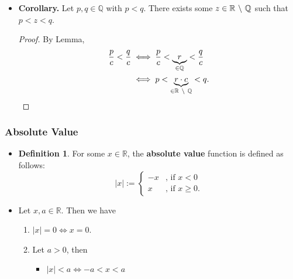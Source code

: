 \documentclass{article}
\newcommand{\Q}{\mathbb{Q}}
\newcommand{\R}{\mathbb{R}}
\newcommand{\?}{\stackrel{?}{=}}
\newcommand{\smallblacksquare}{\rule{0.5em}{0.5em}}
\theoremstyle{definition} %
\newtheorem{definition}[subsection]{Definition} %
\begin{document}
\begin{itemize}
\begin{proof}
\begin{align*}
            &\leq \frac{nx + 1}{n} \\
            &= x + \frac{1}{n} \\
            &= x + y - x \\
            &< y.
        \end{align*}
    \end{proof}
    \item \textbf{Corollary.} Let $p, q \in \Q$ with $p < q$. There exists some $z \in \R \ \symbol{92} \ \Q$ such that $p < z < q$.
    \begin{proof}
        By Lemma,
        \begin{align*}
            \frac{p}{c} < \frac{q}{c} &\iff \frac{p}{c} < \underbrace{r}_{\in \Q} < \frac{q}{c} \\
            &\iff p < \underbrace{r \cdot c}_{\in \R \ \symbol{92} \ \Q} < q.
        \end{align*}
    \end{proof}
\end{itemize}

\subsubsection{Absolute Value}

\begin{itemize}
    \item[]
    \begin{definition}
        For some $x \in \R$, the \textbf{absolute value} function is defined as follows:
    \[ |x| := \begin{cases}
        -x & \text{, if } x < 0 \\
        x & \text{, if } x \geq 0.
    \end{cases} \]
    \end{definition}
    \item[]
    \begin{proposition}
        Let $x, a \in \R$. Then we have
    \begin{enumerate}[label=(\roman*)]
        \item $|x| = 0 \iff x = 0$.
        \item Let $a > 0$, then
        \begin{itemize}[label=\smallblacksquare]
            \item $|x| < a \iff -a < x < a$
        \end{itemize}
    \end{enumerate}
    \end{proposition}
\end{itemize}
\end{document}
